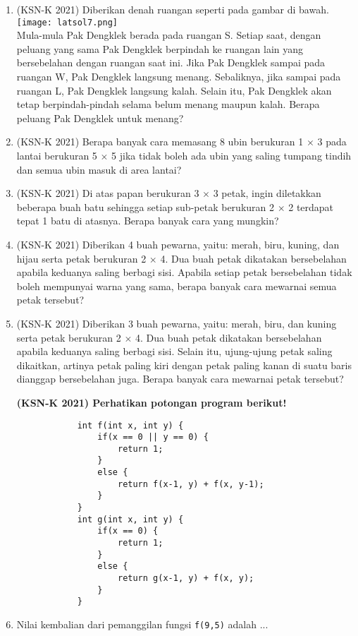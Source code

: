 \documentclass[11pt]{scrartcl}
\begin{document}
\begin{enumerate}
	 	    \item (KSN-K 2021) Diberikan denah ruangan seperti pada gambar di bawah.\\
	 	     	    	\texttt{[image: latsol7.png]}\\
	 	     	    Mula-mula Pak Dengklek berada pada ruangan S. Setiap saat, dengan peluang yang 
	 	     	    sama Pak Dengklek berpindah ke ruangan lain yang bersebelahan dengan ruangan saat 
	 	     	    ini. Jika Pak Dengklek sampai pada ruangan W, Pak Dengklek langsung menang. 
	 	     	    Sebaliknya, jika sampai pada ruangan L, Pak Dengklek langsung kalah. Selain itu, Pak 
	 	     	    Dengklek akan tetap berpindah-pindah selama belum menang maupun kalah. Berapa 
	 	     	    peluang Pak Dengklek untuk menang?
	 	     	    
	 	    \item (KSN-K 2021)  Berapa banyak cara memasang 8 ubin berukuran 1 $\times$ 3 pada lantai berukuran 5 $\times$ 5 jika 
	 	    tidak boleh ada ubin yang saling tumpang tindih dan semua ubin masuk di area lantai?
	 	    
	 	    \item (KSN-K 2021)  Di atas papan berukuran 3 $\times$ 3 petak, ingin diletakkan beberapa buah batu sehingga setiap 
	 	    sub-petak berukuran 2 $\times$ 2 terdapat tepat 1 batu di atasnya. Berapa banyak cara yang 
	 	    mungkin?
	 	    
	 	    \item (KSN-K 2021) Diberikan 4 buah pewarna, yaitu: merah, biru, kuning, dan hijau serta petak berukuran 2 
	 	    $\times$ 4. Dua buah petak dikatakan bersebelahan apabila keduanya saling berbagi sisi. Apabila 
	 	    setiap petak bersebelahan tidak boleh mempunyai warna yang sama, berapa banyak cara 
	 	    mewarnai semua petak tersebut?
	 	    
		    \item (KSN-K 2021) Diberikan 3 buah pewarna, yaitu: merah, biru, dan kuning serta petak berukuran 2 $\times$ 4.
		    Dua buah petak dikatakan bersebelahan apabila keduanya saling berbagi sisi. Selain itu, 
		    ujung-ujung petak saling dikaitkan, artinya petak paling kiri dengan petak paling kanan di 
		    suatu baris dianggap bersebelahan juga. Berapa banyak cara mewarnai petak tersebut?
		    
		    \textbf{(KSN-K 2021) Perhatikan potongan program berikut!}
		    \begin{lstlisting}
		    int f(int x, int y) {
		    	if(x == 0 || y == 0) {
		    		return 1;
		    	}
		    	else {
		    		return f(x-1, y) + f(x, y-1);
		    	}
		    }
		    int g(int x, int y) {
	   	    	if(x == 0) {
	   	    		return 1;
	   	    	}
	   	    	else {
	   	    		return g(x-1, y) + f(x, y);
	   	    	}
	 	    }
		    \end{lstlisting}
		    \item  Nilai kembalian dari pemanggilan fungsi \verb*|f(9,5)| adalah ...
		    

\end{enumerate}
\end{document}
